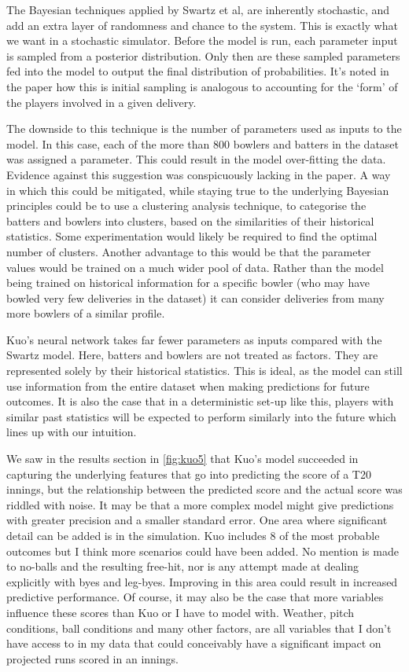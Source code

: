 The Bayesian techniques applied by Swartz et al, are inherently stochastic, and add an extra layer of randomness and chance to the system. This is exactly what we want in a stochastic simulator. Before the model is run, each parameter input is sampled from a posterior distribution. Only then are these sampled parameters fed into the model to output the final distribution of probabilities. It’s noted in the paper how this is initial sampling is analogous to accounting for the ‘form’ of the players involved in a given delivery.

The downside to this technique is the number of parameters used as inputs to the model. In this case, each of the more than 800 bowlers and batters in the dataset was assigned a parameter. This could result in the model over-fitting the data. Evidence against this suggestion was conspicuously lacking in the paper. A way in which this could be mitigated, while staying true to the underlying Bayesian principles could be to use a clustering analysis technique, to categorise the batters and bowlers into clusters, based on the similarities of their historical statistics. Some experimentation would likely be required to find the optimal number of clusters. Another advantage to this would be that the parameter values would be trained on a much wider pool of data. Rather than the model being trained on historical information for a specific bowler (who may have bowled very few deliveries in the dataset) it can consider deliveries from many more bowlers of a similar profile.

Kuo’s neural network takes far fewer parameters as inputs compared with the Swartz model. Here, batters and bowlers are not treated as factors. They are represented solely by their historical statistics. This is ideal, as the model can still use information from the entire dataset when making predictions for future outcomes. It is also the case that in a deterministic set-up like this, players with similar past statistics will be expected to perform similarly into the future which lines up with our intuition. 

We saw in the results section in \cref{fig:kuo5} that Kuo’s model succeeded in capturing the underlying features that go into predicting the score of a T20 innings, but the relationship between the predicted score and the actual score was riddled with noise. It may be that a more complex model might give predictions with greater precision and a smaller standard error. One area where significant detail can be added is in the simulation. Kuo includes 8 of the most probable outcomes but I think more scenarios could have been added. No mention is made to no-balls and the resulting free-hit, nor is any attempt made at dealing explicitly with byes and leg-byes. Improving in this area could result in increased predictive performance. Of course, it may also be the case that more variables influence these scores than Kuo or I have to model with. Weather, pitch conditions, ball conditions\footnotemark{} and many other factors, are all variables that I don’t have access to in my data that could conceivably have a significant impact on projected runs scored in an innings.

